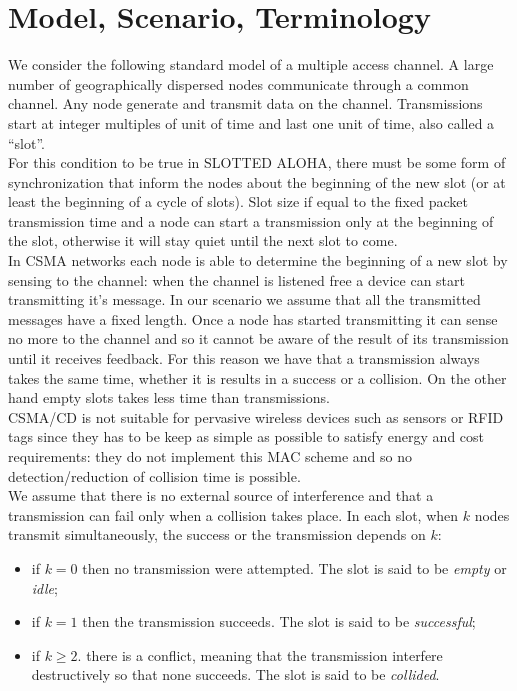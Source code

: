 \documentclass[12pt,a4paper,twocolumns]{report}
\begin{document}
\section{Model, Scenario, Terminology}

We consider the following standard model of a multiple access channel. A large number of geographically dispersed nodes communicate through a common channel. Any node generate and transmit data on the channel. Transmissions start at integer multiples of unit of time and last one unit of time, also called a ``slot''.\\

For this condition to be true in SLOTTED ALOHA, there must be some form of synchronization that inform the nodes about the beginning of the new slot (or at least the beginning of a cycle of slots). Slot size if equal to the fixed packet transmission time and a node can start a transmission only at the beginning of the slot, otherwise it will stay quiet until the next slot to come.\\

In CSMA networks each node is able to determine the beginning of a new slot by sensing to the channel: when the channel is listened free a device can start transmitting it's message. In our scenario we assume that all the transmitted messages have a fixed length. Once a node has started transmitting it can sense no more to the channel and so it cannot be aware of the result of its transmission until it receives feedback. For this reason we have that a transmission always takes the same time, whether it is results in a success or a collision. On the other hand empty slots takes less time than transmissions.\\

CSMA/CD is not suitable for pervasive wireless devices such as sensors or RFID tags since they has to be keep as simple as possible to satisfy energy and cost requirements: they do not implement this MAC scheme and so no detection/reduction of collision time is possible.\\

We assume that there is no external source of interference and that a transmission can fail only when a collision takes place.
In each slot, when $k$ nodes transmit simultaneously, the success or the transmission depends on $k$:
\begin{itemize}
\item if $k=0$ then no transmission were attempted. The slot is said to be \emph{empty} or \emph{idle};
\item if $k=1$ then the transmission succeeds. The slot is said to be \emph{successful};
\item if $k\geq 2$. there is a conflict, meaning that the transmission interfere destructively so that none succeeds. The slot is said to be \emph{collided}.
\end{itemize}
\end{document}
